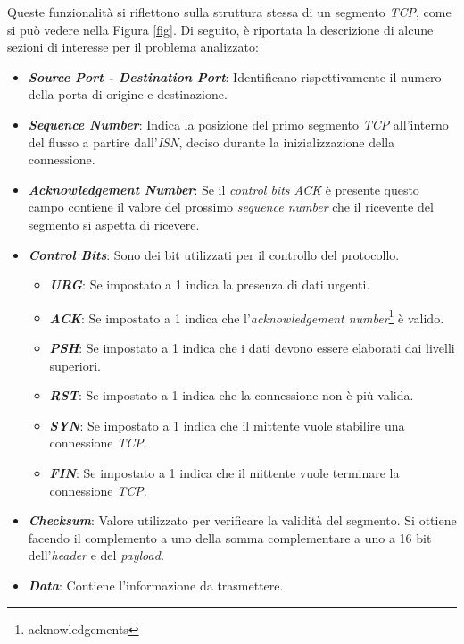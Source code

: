 \noindent Queste funzionalità si riflettono sulla struttura stessa di un segmento \emph{TCP}, come si può vedere nella Figura \ref{fig}. 
Di seguito, è riportata la descrizione di alcune sezioni di interesse per il problema analizzato:

\begin{itemize}
\item \textit{\textbf{Source Port - Destination Port}}: Identificano rispettivamente il numero della porta di origine e destinazione.
\item \textit{\textbf{Sequence Number}}: Indica la posizione del primo segmento \emph{TCP} all'interno del flusso a partire dall'\emph{\gls*{ISN}{}}, deciso durante la inizializzazione della connessione.
\item \textit{\textbf{Acknowledgement Number}}: Se il \emph{control bits ACK} è presente questo campo contiene il valore del prossimo \emph{sequence number} che il ricevente del segmento si aspetta di ricevere.
\item \textit{\textbf{Control Bits}}: Sono dei bit utilizzati per il controllo del protocollo. 
\begin{itemize}
    \item \textit{\textbf{URG}}: Se impostato a 1 indica la presenza di dati urgenti.
    \item \textit{\textbf{ACK}}: Se impostato a 1 indica che l'\emph{acknowledgement number}\footnote{\gls{acknowledgements}} è valido.
    \item \textit{\textbf{PSH}}: Se impostato a 1 indica che i dati devono essere elaborati dai livelli superiori.
    \item \textit{\textbf{RST}}: Se impostato a 1 indica che la connessione non è più valida.
    \item \textit{\textbf{SYN}}: Se impostato a 1 indica che il mittente vuole stabilire una connessione \emph{TCP}.
    \item \textit{\textbf{FIN}}: Se impostato a 1 indica che il mittente vuole terminare la connessione \emph{TCP}.
\end{itemize}
\item \textit{\textbf{Checksum}}: Valore utilizzato per verificare la validità del segmento. Si ottiene facendo il complemento a uno della somma complementare a uno a 16 bit dell'\emph{header} e del \emph{payload}.
\item \textit{\textbf{Data}}: Contiene l'informazione da trasmettere.
\end{itemize}

